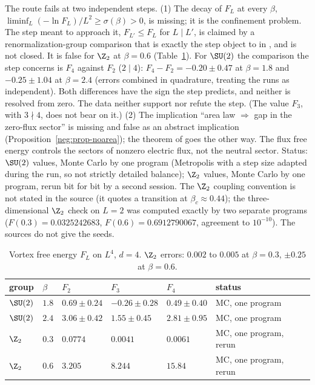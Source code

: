 \begin{observation}\label{neg:obs-vort}
The route fails at two independent steps.
\textup{(1)} The decay of $F_L$ at every $\beta$, $\liminf_L(-\ln F_L)/L^2\ge\sigma(\beta)>0$, is
missing; it is the confinement problem. The step meant to approach it, $F_{L'}\le F_L$ for
$L\mid L'$, is claimed by a renormalization-group comparison that is exactly the step
\cite{IS07,IS08} object to in \cite{To07}, and is not closed. It is false for $\Z_2$ at
$\beta=0.6$ (Table~\ref{neg:tab-vort}). For $\SU(2)$ the comparison the step concerns is $F_4$
against $F_2$ ($2\mid4$): $F_4-F_2=-0.20\pm0.47$ at $\beta=1.8$ and $-0.25\pm1.04$ at
$\beta=2.4$ (errors combined in quadrature, treating the runs as independent). Both differences
have the sign the step predicts, and neither is resolved from zero. The data neither support nor
refute the step. (The value $F_3$, with $3\nmid4$, does not bear on it.)
\textup{(2)} The implication ``area law $\Rightarrow$ gap in the zero-flux sector'' is missing
and false as an abstract implication (Proposition~\ref{neg:prop-noarea}); the theorem of
\cite{Ch21} goes the other way. The flux free energy controls the sectors of nonzero electric
flux, not the neutral sector.
Status: $\SU(2)$ values, Monte Carlo by one program (Metropolis with a step size adapted during
the run, so not strictly detailed balance); $\Z_2$ values, Monte Carlo by one program, rerun bit
for bit by a second session. The $\Z_2$ coupling convention is not stated in the source (it
quotes a transition at $\beta_c\approx0.44$); the three-dimensional $\Z_2$ check on $L=2$ was computed exactly by
two separate programs ($F(0.3)=0.0325242683$, $F(0.6)=0.6912790067$, agreement to $10^{-10}$).
The sources do not give the seeds.
\end{observation}

\begin{table}[ht]
\centering
\small
\begin{tabular}{@{}llllll@{}}
\toprule
group & $\beta$ & $F_2$ & $F_3$ & $F_4$ & status \\
\midrule
$\SU(2)$ & $1.8$ & $0.69\pm0.24$ & $-0.26\pm0.28$ & $0.49\pm0.40$ & MC, one program \\
$\SU(2)$ & $2.4$ & $3.06\pm0.42$ & $1.55\pm0.45$ & $2.81\pm0.95$ & MC, one program \\
$\Z_2$ & $0.3$ & $0.0774$ & $0.0041$ & $0.0061$ & MC, one program, rerun \\
$\Z_2$ & $0.6$ & $3.205$ & $8.244$ & $15.84$ & MC, one program, rerun \\
\bottomrule
\end{tabular}
\caption{Vortex free energy $F_L$ on $L^4$, $d=4$. $\Z_2$ errors: $0.002$ to $0.005$ at
$\beta=0.3$, $\pm0.25$ at $\beta=0.6$.}
\label{neg:tab-vort}
\end{table}

